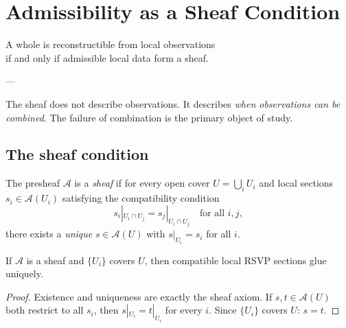 
\chapter{Admissibility as a Sheaf Condition}
\label{ch:sheaf}

\epigraph{%
  A whole is reconstructible from local observations\\
  if and only if admissible local data form a sheaf.%
}{---}

\begin{LocalGlobal}
  The sheaf does not describe observations.
  It describes \emph{when observations can be combined}.
  The failure of combination is the primary object of study.
\end{LocalGlobal}

\section{The sheaf condition}

\begin{definition}
  \label{def:sheaf-condition}
  The presheaf $\mathcal{A}$ is a \emph{sheaf} if for every
  open cover $U = \bigcup_i U_i$ and local sections
  $s_i \in \mathcal{A}(U_i)$ satisfying the compatibility
  condition
  \[
    s_i|_{U_i \cap U_j} = s_j|_{U_i \cap U_j}
    \quad\text{for all } i,j,
  \]
  there exists a \emph{unique} $s \in \mathcal{A}(U)$ with
  $s|_{U_i} = s_i$ for all $i$.
\end{definition}

\begin{theorem}
  \label{thm:unique-gluing}
  \statusproven{}
  If $\mathcal{A}$ is a sheaf and $\{U_i\}$ covers $U$,
  then compatible local RSVP sections glue uniquely.
\end{theorem}

\begin{proof}
  Existence and uniqueness are exactly the sheaf axiom.
  If $s, t \in \mathcal{A}(U)$ both restrict to all $s_i$,
  then $s|_{U_i} = t|_{U_i}$ for every $i$.
  Since $\{U_i\}$ covers $U$: $s = t$.
\end{proof}


